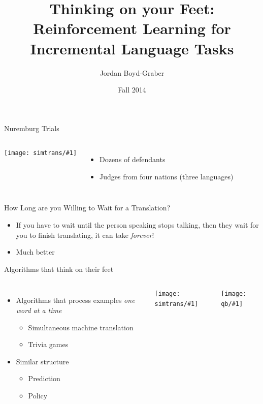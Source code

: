 \documentclass[compress]{beamer}
\title[Thinking on Your Feet]{Thinking on your Feet: Reinforcement Learning for Incremental
Language Tasks}
\author{ Jordan Boyd-Graber}
\date{Fall 2014}
\institute[Boulder] %
{University of Colorado Boulder}
\newcommand{\gfxs}[2]{
\begin{center}
	\texttt{[image: simtrans/\#1]}
\end{center}
}
\newcommand{\gfxq}[2]{
\begin{center}
	\texttt{[image: qb/\#1]}
\end{center}
}
\begin{document}
\frame{
\titlepage
\tiny
}


\begin{frame}{Nuremburg Trials}

\begin{columns}


    \gfxs{nuremberg_trials}{1.0}


    \begin{itemize}
        \item Dozens of defendants
        \item Judges from four nations (three languages)
     \end{itemize}

\end{columns}

\end{frame}


\begin{frame}{How Long are you Willing to Wait for a Translation?}

\begin{itemize}
  \item If you have to wait until the person speaking stops talking,
    then they wait for you to finish translating, it can take
    \emph{forever}!
    \pause
   \item Much better 
\end{itemize}

\end{frame}


\begin{frame}{Algorithms that think on their feet}

\begin{columns}

  \begin{itemize}
     \item Algorithms that process examples \emph{one word at a time}
       \begin{itemize}
         \item Simultaneous machine translation
         \item Trivia games
       \end{itemize}
      \item Similar structure
        \begin{itemize}
          \item Prediction
          \item Policy
        \end{itemize}
  \end{itemize}


  \gfxs{nuremberg_translators}{.7}
  \gfxq{quizbowl}{.7}

\end{columns}

\end{frame}
\end{document}
